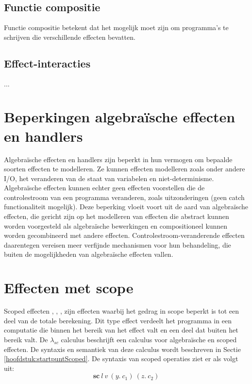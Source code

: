 \subsection{Functie compositie}
Functie compositie betekent dat het mogelijk moet zijn om programma's te schrijven die verschillende effecten bevatten. 

\subsection{Effect-interacties}
...

\section{Beperkingen algebraïsche effecten en handlers}
Algebraïsche effecten en handlers zijn beperkt in hun vermogen om bepaalde soorten effecten te modelleren. Ze kunnen effecten modelleren zoals onder andere I/O, het veranderen van de staat van variabelen en niet-determinisme. Algebraïsche effecten kunnen echter geen effecten voorstellen die de controlestroom van een programma veranderen, zoals uitzonderingen (geen catch functionaliteit mogelijk). Deze beperking vloeit voort uit de aard van algebraïsche effecten, die gericht zijn op het modelleren van effecten die abstract kunnen worden voorgesteld als algebraïsche bewerkingen en compositioneel kunnen worden gecombineerd met andere effecten. Controlestroom-veranderende effecten daarentegen vereisen meer verfijnde mechanismen voor hun behandeling, die buiten de mogelijkheden van algebraïsche effecten vallen.

\section{Effecten met scope} \label{hoofdstuk:AchteffScope}
Scoped effecten \cite{Bosman2022}, \cite{Wu2014}, \cite{Yang2022}, \cite{Pirog2018} zijn effecten waarbij het gedrag in scope beperkt is tot een deel van de totale berekening. Dit type effect verdeelt het programma in een computatie die binnen het bereik van het effect valt en een deel dat buiten het bereik valt. De $\lambda_{sc}$ calculus \cite{Bosman2022} beschrijft een calculus voor algebraïsche en scoped effecten. De syntaxis en semantiek van deze calculus wordt beschreven in Sectie \ref{hoofdstuk:startpuntScoped}. De syntaxis van scoped operaties ziet er als volgt uit:
\begin{equation}
    \textbf{sc}\:l\:v\:(y.\:c_{1})\:(z.\:c_{2})
\end{equation}

